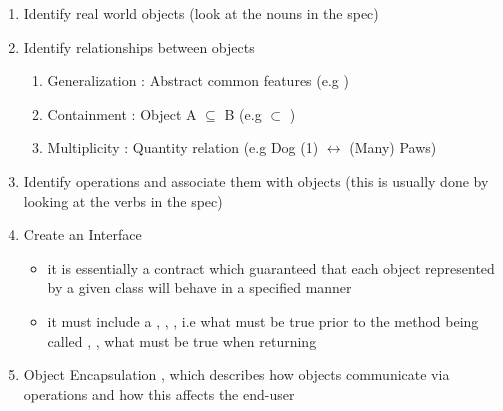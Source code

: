 \begin{enumerate}
	\item Identify real world objects (look at the nouns in the spec)
	\item Identify relationships between objects
		\begin{enumerate}
			\item[] Generalization : Abstract common features (e.g )
			\item[] Containment : Object A $\subseteq$ B (e.g  $\subset$
					)
			\item[] Multiplicity : Quantity relation (e.g Dog (1)
					$\leftrightarrow$ (Many) Paws)
		\end{enumerate}
	\item{Identify operations and associate them with objects (this is usually
		done by looking at the verbs in the spec)}
	\item{Create an Interface}
		\begin{itemize}
			\item[]{it is essentially a contract which guaranteed that each object
					represented by a given class will behave in a specified manner}
			\item[]{it must include a  ,
 ,  , i.e what must be true prior
to the method being called ,  , what must be true when
returning}
		\end{itemize}
		\item{Object Encapsulation , which describes how objects communicate
		via operations and how this affects the end-user} 
\end{enumerate}


